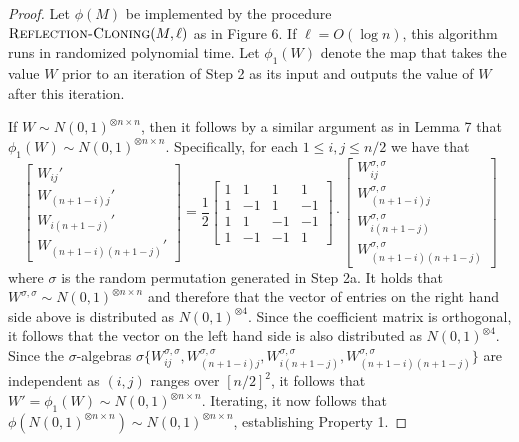 \documentclass[11pt]{article}
\begin{document}
\begin{proof}
Let $\phi(M)$ be implemented by the procedure $\textsc{Reflection-Cloning}(M, \ell)$ as in Figure 6. If $\ell = O(\log n)$, this algorithm runs in randomized polynomial time. Let $\phi_1(W)$ denote the map that takes the value $W$ prior to an iteration of Step 2 as its input and outputs the value of $W$ after this iteration.

If $W \sim N(0, 1)^{\otimes n \times n}$, then it follows by a similar argument as in Lemma 7 that $\phi_1(W) \sim N(0, 1)^{\otimes n \times n}$. Specifically, for each $1 \le i, j \le n/2$ we have that
$$\left[ \begin{matrix} W_{ij}' \\ W_{(n+1-i)j}' \\ W_{i(n+1-j)}' \\ W_{(n+1-i)(n+1-j)}' \end{matrix} \right] = \frac{1}{2} \left[ \begin{array}{rrrr} 1 & 1 & 1 & 1 \\ 1 & -1 & 1 & -1 \\ 1 & 1 & -1 & -1 \\ 1 & -1 & -1 & 1 \end{array} \right] \cdot \left[ \begin{matrix} W_{ij}^{\sigma, \sigma} \\ W_{(n+1-i)j}^{\sigma, \sigma} \\ W_{i(n+1-j)}^{\sigma, \sigma} \\ W_{(n+1-i)(n+1-j)}^{\sigma, \sigma} \end{matrix} \right]$$
where $\sigma$ is the random permutation generated in Step 2a. It holds that $W^{\sigma, \sigma} \sim N(0, 1)^{\otimes n \times n}$ and therefore that the vector of entries on the right hand side above is distributed as $N(0, 1)^{\otimes 4}$. Since the coefficient matrix is orthogonal, it follows that the vector on the left hand side is also distributed as $N(0, 1)^{\otimes 4}$. Since the $\sigma$-algebras $\sigma\{W_{ij}^{\sigma, \sigma}, W_{(n+1-i)j}^{\sigma, \sigma}, W_{i(n+1-j)}^{\sigma, \sigma}, W_{(n+1-i)(n+1-j)}^{\sigma, \sigma} \}$ are independent as $(i, j)$ ranges over $[n/2]^2$, it follows that $W' = \phi_1(W) \sim N(0, 1)^{\otimes n \times n}$. Iterating, it now follows that $\phi(N(0, 1)^{\otimes n \times n}) \sim N(0, 1)^{\otimes n \times n}$, establishing Property 1.


\end{proof}
\end{document}
